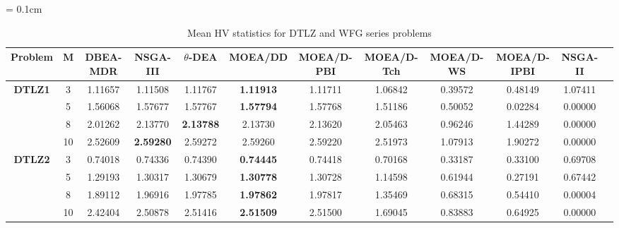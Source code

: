 \documentclass{sig-alternate}
\begin{document}
\begin{table}[!htb]\scriptsize
\centering
\renewcommand{\arraystretch}{0.9}
\caption{Mean HV statistics for DTLZ and WFG series problems}
\label{tab:HV}
\tabcolsep = 0.1cm
\begin{tabular}{|c|c|c|c|c|c|c|c|c|c|c|c|}
\noalign{\smallskip}\hline
\textbf{Problem}                & \textbf{M} & \textbf{DBEA-MDR} & \textbf{NSGA-III} & \textbf{$\theta$-DEA} & \textbf{MOEA/DD} & \textbf{MOEA/D-PBI} & \textbf{MOEA/D-Tch} & \textbf{MOEA/D-WS} & \textbf{MOEA/D-IPBI} & \textbf{NSGA-II} \\ \hline
\multirow{4}{*}{\textbf{DTLZ1}} & 3          & 1.11657          & 1.11508           & 1.11767               & \textbf{1.11913} & 1.11711             & 1.06842             & 0.39572            & 0.48149              & 1.07411          \\ \cline{2-11} 
& 5          & 1.56068          & 1.57677           & 1.57767               & \textbf{1.57794} & 1.57768             & 1.51186             & 0.50052            & 0.02284              & 0.00000          \\ \cline{2-11} 
& 8          & 2.01262          & 2.13770           & \textbf{2.13788}      & 2.13730          & 2.13620             & 2.05463             & 0.96246            & 1.44289              & 0.00000          \\ \cline{2-11} 
& 10         & 2.52609          & \textbf{2.59280}  & 2.59272               & 2.59260          & 2.59220             & 2.51973             & 1.07913            & 1.90272              & 0.00000          \\ \hline
\multirow{4}{*}{\textbf{DTLZ2}} & 3          & 0.74018          & 0.74336           & 0.74390               & \textbf{0.74445} & 0.74418             & 0.70168             & 0.33187            & 0.33100              & 0.69708          \\ \cline{2-11} 
& 5          & 1.29193          & 1.30317           & 1.30679               & \textbf{1.30778} & 1.30728             & 1.14598             & 0.61944            & 0.27191              & 0.67442          \\ \cline{2-11} 
& 8          & 1.89112          & 1.96916           & 1.97785               & \textbf{1.97862} & 1.97817             & 1.35469             & 0.68315            & 0.54410              & 0.00004          \\ \cline{2-11} 
& 10         & 2.42404          & 2.50878           & 2.51416               & \textbf{2.51509} & 2.51500             & 1.69045             & 0.83883            & 0.64925              & 0.00000          \\ \hline

\end{tabular}
\end{table}
\end{document}
